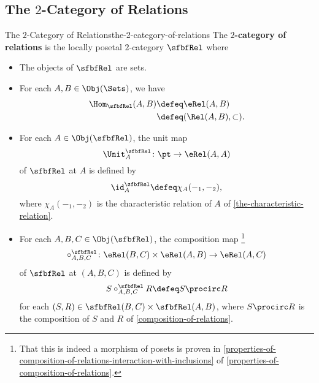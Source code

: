 \subsection{The $2$-Category of Relations}\label{subsection-the-2-category-of-relations}
\begin{definition}{The $2$-Category of Relations}{the-2-category-of-relations}%
    The \textbf{$2$-category of relations} is the locally posetal $2$-category $\sfbfRel$ where
    \begin{itemize}
        \item{}The objects of $\sfbfRel$ are sets.
        \item{}For each $A,B\in\Obj(\Sets)$, we have
            \begin{align*}
                \Hom_{\sfbfRel}(A,B) &\defeq \eRel(A,B)\\%
                                     &\defeq (\Rel(A,B),\subset).%
            \end{align*}
        \item{}For each $A\in\Obj(\sfbfRel)$, the unit map
            \[
                \Unit^{\sfbfRel}_{A}
                \colon
                \pt
                \to
                \eRel(A,A)
            \]%
            of $\sfbfRel$ at $A$ is defined by
            \[
                \id^{\sfbfRel}_{A}
                \defeq
                \chi_{A}(-_{1},-_{2}),
            \]%
            where $\chi_{A}(-_{1},-_{2})$ is the characteristic relation of $A$ of \cref{the-characteristic-relation}.
        \item{}For each $A,B,C\in\Obj(\sfbfRel)$, the composition map%
            \footnote{%
                That this is indeed a morphism of posets is proven in \cref{properties-of-composition-of-relations-interaction-with-inclusions} of \cref{properties-of-composition-of-relations}.
                \par\vspace*{\TCBBoxCorrection}
            }%
            \[
                \circ^{\sfbfRel}_{A,B,C}%
                \colon%
                \eRel(B,C)%
                \times%
                \eRel(A,B)%
                \to%
                \eRel(A,C)%
            \]%
            of $\sfbfRel$ at $(A,B,C)$ is defined by%
            \[
                S\mathbin{{\circ}^{\sfbfRel}_{A,B,C}}R
                \defeq
                S\procirc R
            \]%
            for each $(S,R)\in\sfbfRel(B,C)\times\sfbfRel(A,B)$, where $S\procirc R$ is the composition of $S$ and $R$ of \cref{composition-of-relations}.
    \end{itemize}
\end{definition}
